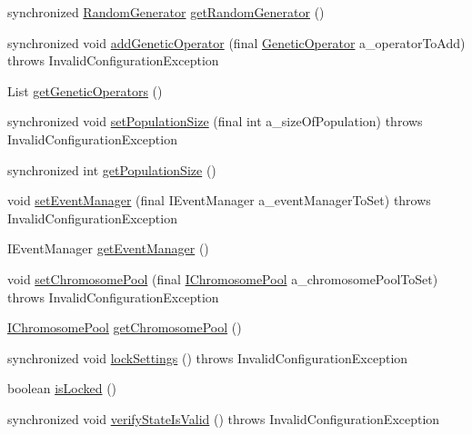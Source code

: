 \begin{DoxyCompactItemize}
\item 
synchronized \hyperlink{interfaceorg_1_1jgap_1_1_random_generator}{Random\-Generator} \hyperlink{classorg_1_1jgap_1_1_configuration_ada272cbdddd307fcc4cfa9a32b0e50f6}{get\-Random\-Generator} ()
\item 
synchronized void \hyperlink{classorg_1_1jgap_1_1_configuration_a47b53f6366287f15d0b26602dd06e21c}{add\-Genetic\-Operator} (final \hyperlink{interfaceorg_1_1jgap_1_1_genetic_operator}{Genetic\-Operator} a\-\_\-operator\-To\-Add)  throws Invalid\-Configuration\-Exception 
\item 
List \hyperlink{classorg_1_1jgap_1_1_configuration_a70feb927b8ca2d0d90f5672a06504642}{get\-Genetic\-Operators} ()
\item 
synchronized void \hyperlink{classorg_1_1jgap_1_1_configuration_ae5defd9a86af096abb64844b976da282}{set\-Population\-Size} (final int a\-\_\-size\-Of\-Population)  throws Invalid\-Configuration\-Exception 
\item 
synchronized int \hyperlink{classorg_1_1jgap_1_1_configuration_a21cd64586b838743538195b6e8a42a11}{get\-Population\-Size} ()
\item 
void \hyperlink{classorg_1_1jgap_1_1_configuration_af842e1f17ca9b6261f7c13f7918c27eb}{set\-Event\-Manager} (final I\-Event\-Manager a\-\_\-event\-Manager\-To\-Set)  throws Invalid\-Configuration\-Exception 
\item 
I\-Event\-Manager \hyperlink{classorg_1_1jgap_1_1_configuration_a1e52f968a999353b0fd83d4ae1a0226e}{get\-Event\-Manager} ()
\item 
void \hyperlink{classorg_1_1jgap_1_1_configuration_a45e3805863470751268692549cb721b7}{set\-Chromosome\-Pool} (final \hyperlink{interfaceorg_1_1jgap_1_1_i_chromosome_pool}{I\-Chromosome\-Pool} a\-\_\-chromosome\-Pool\-To\-Set)  throws Invalid\-Configuration\-Exception 
\item 
\hyperlink{interfaceorg_1_1jgap_1_1_i_chromosome_pool}{I\-Chromosome\-Pool} \hyperlink{classorg_1_1jgap_1_1_configuration_ab1a4972d0466e7ef9cb15da1f2a52953}{get\-Chromosome\-Pool} ()
\item 
synchronized void \hyperlink{classorg_1_1jgap_1_1_configuration_a7613143675140e68fc9a09dacfa41e1a}{lock\-Settings} ()  throws Invalid\-Configuration\-Exception 
\item 
boolean \hyperlink{classorg_1_1jgap_1_1_configuration_ac7eade2f7f671da127aa9624759ee345}{is\-Locked} ()
\item 
synchronized void \hyperlink{classorg_1_1jgap_1_1_configuration_a7b844357f8d9c3dae73bd9742794fda4}{verify\-State\-Is\-Valid} ()  throws Invalid\-Configuration\-Exception 

\end{DoxyCompactItemize}
